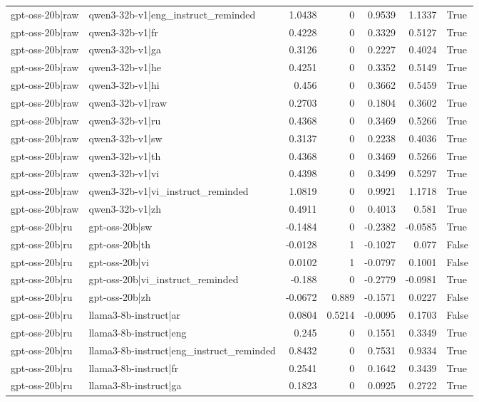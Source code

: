 \begin{table}
\begin{tabular}{l l r r r r l}
gpt-oss-20b|raw & qwen3-32b-v1|eng_instruct_reminded & 1.0438 & 0 & 0.9539 & 1.1337 & True \\
gpt-oss-20b|raw & qwen3-32b-v1|fr & 0.4228 & 0 & 0.3329 & 0.5127 & True \\
gpt-oss-20b|raw & qwen3-32b-v1|ga & 0.3126 & 0 & 0.2227 & 0.4024 & True \\
gpt-oss-20b|raw & qwen3-32b-v1|he & 0.4251 & 0 & 0.3352 & 0.5149 & True \\
gpt-oss-20b|raw & qwen3-32b-v1|hi & 0.456 & 0 & 0.3662 & 0.5459 & True \\
gpt-oss-20b|raw & qwen3-32b-v1|raw & 0.2703 & 0 & 0.1804 & 0.3602 & True \\
gpt-oss-20b|raw & qwen3-32b-v1|ru & 0.4368 & 0 & 0.3469 & 0.5266 & True \\
gpt-oss-20b|raw & qwen3-32b-v1|sw & 0.3137 & 0 & 0.2238 & 0.4036 & True \\
gpt-oss-20b|raw & qwen3-32b-v1|th & 0.4368 & 0 & 0.3469 & 0.5266 & True \\
gpt-oss-20b|raw & qwen3-32b-v1|vi & 0.4398 & 0 & 0.3499 & 0.5297 & True \\
gpt-oss-20b|raw & qwen3-32b-v1|vi_instruct_reminded & 1.0819 & 0 & 0.9921 & 1.1718 & True \\
gpt-oss-20b|raw & qwen3-32b-v1|zh & 0.4911 & 0 & 0.4013 & 0.581 & True \\
gpt-oss-20b|ru & gpt-oss-20b|sw & -0.1484 & 0 & -0.2382 & -0.0585 & True \\
gpt-oss-20b|ru & gpt-oss-20b|th & -0.0128 & 1 & -0.1027 & 0.077 & False \\
gpt-oss-20b|ru & gpt-oss-20b|vi & 0.0102 & 1 & -0.0797 & 0.1001 & False \\
gpt-oss-20b|ru & gpt-oss-20b|vi_instruct_reminded & -0.188 & 0 & -0.2779 & -0.0981 & True \\
gpt-oss-20b|ru & gpt-oss-20b|zh & -0.0672 & 0.889 & -0.1571 & 0.0227 & False \\
gpt-oss-20b|ru & llama3-8b-instruct|ar & 0.0804 & 0.5214 & -0.0095 & 0.1703 & False \\
gpt-oss-20b|ru & llama3-8b-instruct|eng & 0.245 & 0 & 0.1551 & 0.3349 & True \\
gpt-oss-20b|ru & llama3-8b-instruct|eng_instruct_reminded & 0.8432 & 0 & 0.7531 & 0.9334 & True \\
gpt-oss-20b|ru & llama3-8b-instruct|fr & 0.2541 & 0 & 0.1642 & 0.3439 & True \\
gpt-oss-20b|ru & llama3-8b-instruct|ga & 0.1823 & 0 & 0.0925 & 0.2722 & True \\

\end{tabular}
\end{table}
